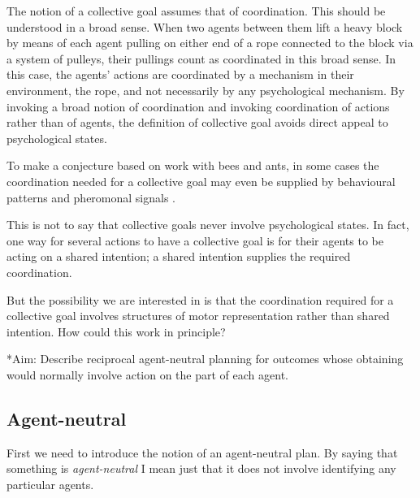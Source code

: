 \documentclass[12pt,\papersize]{extarticle}
\begin{document}
The notion of a collective goal assumes that of coordination.  This should be understood in a broad sense.  
When two agents between them lift a heavy block by means of each agent pulling on either end of a rope connected to the block via a system of pulleys, their pullings count as coordinated in this broad sense.  
In this case, the agents' actions are coordinated by a mechanism in their environment, the rope, and not necessarily by any psychological mechanism.  
By invoking a broad notion of coordination 
and invoking coordination of actions rather than of agents,
the definition of collective goal avoids direct appeal to psychological states.

To make a conjecture based on work with bees and ants, in some cases
the coordination needed for a collective goal may even be supplied by 
	 behavioural patterns \citep{seeley2010honeybee}  
	 and 
	 pheromonal signals \citep[pp.\ 178-83, 206-21]{hoelldobler2009superorganism}.


This is not to say that collective goals never involve psychological states.
In fact,
one way for several actions to have a collective goal is for their agents to be acting on a shared intention; 
a shared intention supplies the required coordination.

But the possibility we are interested in is that the coordination required for a collective goal involves structures of motor representation rather than shared intention.
How could this work in principle?


*Aim: Describe reciprocal agent-neutral planning for outcomes whose obtaining would normally involve action on the part of each agent.

\subsection{Agent-neutral}

First we need to introduce the notion of an agent-neutral plan.
By saying that something is \emph{agent-neutral} I mean just that it does not involve identifying any particular agents.  
\end{document}
